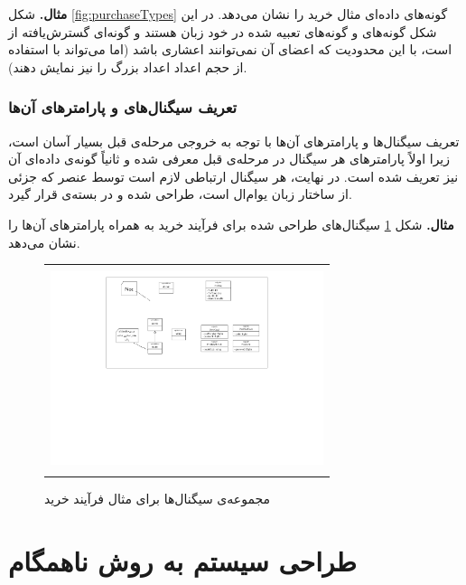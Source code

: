 \textbf{مثال. } شکل \ref{fig:purchaseTypes} گونه‌های داده‌ای مثال خرید را نشان می‌دهد. در این شکل گونه‌های  و  گونه‌های تعبیه شده در خود زبان  هستند و  گونه‌ای گسترش‌یافته از  است، با این محدودیت که اعضای آن نمی‌توانند اعشاری باشد (اما می‌تواند با استفاده از حجم اعداد  اعداد بزرگ را نیز نمایش دهند).

\subsubsection{تعریف سیگنال‌های و پارامترهای آن‌ها}
تعریف سیگنال‌ها و پارامترهای آن‌ها با توجه به خروجی مرحله‌ی قبل بسیار آسان است، زیرا اولاً پارامترهای هر سیگنال در مرحله‌ی قبل معرفی شده و ثانیاً گونه‌ی داده‌ای آن نیز تعریف شده است. در نهایت، هر سیگنال ارتباطی لازم است توسط عنصر  که جزئی از ساختار زبان یوام‌ال است، طراحی شده و در بسته‌ی {\large{}} قرار گیرد.

\textbf{مثال. } شکل \ref{fig:purchaseSignals} سیگنال‌های طراحی شده برای فرآیند خرید به همراه پارامترهای آن‌ها را نشان می‌دهد.
\begin{figure}
    \begin{center}
    \begin{tabular}{| c |}
   	\hline
	\\
  	 \includegraphics[width=8cm]{4-ProposedFramework/Figures/purchaseSignals.pdf} \\
	\\
	\hline
  \end{tabular}
  \end{center}
   \caption{\label{fig:purchaseSignals} مجموعه‌ی سیگنال‌ها برای مثال فرآیند خرید}
\end{figure}


\section{طراحی سیستم به روش ناهمگام}

